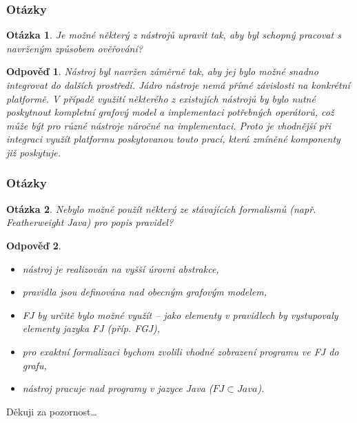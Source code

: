\documentclass{beamer}
\newtheorem*{question}{Otázka}
\newtheorem*{response}{Odpověď}
\begin{document}
\begin{frame}
  \frametitle{Otázky}
  \begin{question}
    Je možné některý z nástrojů upravit tak, aby byl schopný pracovat s navrženým způsobem ověřování?
  \end{question}
  \begin{response}
    Nástroj byl navržen záměrně tak, aby jej bylo možné snadno integrovat do dalších prostředí. Jádro nástroje nemá přímé závislosti na konkrétní platformě. V případě využití některého z existujích nástrojů by bylo nutné poskytnout kompletní grafový model a implementaci potřebných operátorů, což může být pro různé nástroje náročné na implementaci. Proto je vhodnější při integraci využít platformu poskytovanou touto prací, která zmíněné komponenty již poskytuje.
  \end{response}
\end{frame}

\begin{frame}
  \frametitle{Otázky}
  \begin{question}
    Nebylo možné použít některý ze stávajících formalismů (např. Featherweight Java) pro popis pravidel?
  \end{question}
  \begin{response}
    \begin{itemize}
    \item nástroj je realizován na vyšší úrovni abstrakce,
    \item pravidla jsou definována nad obecným grafovým modelem,
    \item FJ by určitě bylo možné využít -- jako elementy v pravidlech by vystupovaly elementy jazyka FJ (příp. FGJ),
    \item pro exaktní formalizaci bychom zvolili vhodné zobrazení programu ve FJ do grafu,
    \item nástroj pracuje nad programy v jazyce Java ($FJ \subset Java$).
    \end{itemize}
  \end{response}
\end{frame}

\begin{frame}
  \begin{center}
    {\huge Děkuji za pozornost\ldots}
  \end{center}
\end{frame}
\end{document}

